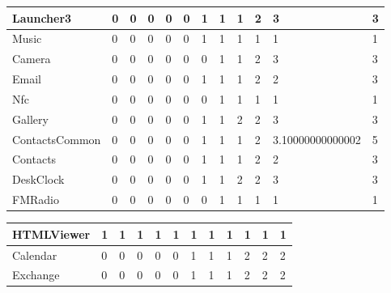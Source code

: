 \begin{tabular}{|l|l|l|l|l|l|l|l|l|l|l|l|}
\hline
Launcher3&0&0&0&0&0&1&1&1&2&3&3\\
\hline
Music&0&0&0&0&0&1&1&1&1&1&1\\
\hline
Camera&0&0&0&0&0&0&1&1&2&3&3\\
\hline
Email&0&0&0&0&0&1&1&1&2&2&3\\
\hline
Nfc&0&0&0&0&0&0&1&1&1&1&1\\
\hline
Gallery&0&0&0&0&0&1&1&2&2&3&3\\
\hline
ContactsCommon&0&0&0&0&0&1&1&1&2&3.10000000000002&5\\
\hline
Contacts&0&0&0&0&0&1&1&1&2&2&3\\
\hline
DeskClock&0&0&0&0&0&1&1&2&2&3&3\\
\hline
FMRadio&0&0&0&0&0&0&1&1&1&1&1\\
\hline
\end{tabular}
\newline
\begin{tabular}{|l|l|l|l|l|l|l|l|l|l|l|l|}
\hline
HTMLViewer&1&1&1&1&1&1&1&1&1&1&1\\
\hline
Calendar&0&0&0&0&0&1&1&1&2&2&2\\
\hline
Exchange&0&0&0&0&0&1&1&1&2&2&2\\
\hline
\end{tabular}
